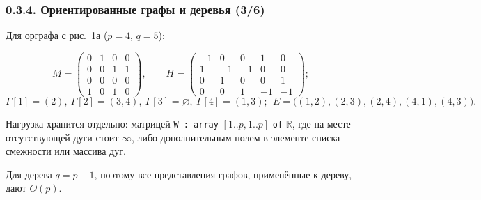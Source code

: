 \documentclass[mathserif,12pt,aspectratio=169]{beamer}
\begin{document}
\begin{frame}
\frametitle{0.3.4. Ориентированные графы и деревья (3/6)}

\begin{example}
Для орграфа с рис.~1а ($p=4$, $q=5$):
\end{example}
\vspace{-14pt}
$$M=\begin{pmatrix}0&1&0&0\\0&0&1&1\\0&0&0&0\\1&0&1&0\end{pmatrix}\!,\qquad
H=\begin{pmatrix}-1&0&0&1&0\\1&-1&-1&0&0\\0&1&0&0&1\\0&0&1&-1&-1\end{pmatrix}\!;$$
\vspace{-12pt}
$$\Gamma[1]=(2),\ \Gamma[2]=(3,4),\ \Gamma[3]=\varnothing,\ \Gamma[4]=(1,3);
\ \ E=\big((1,2),(2,3),(2,4),(4,1),(4,3)\big).$$
\vspace{-18pt}

Нагрузка хранится отдельно: матрицей \texttt{W : array} $[1..p,1..p]$
\texttt{of} $\mathbb{R}$, где на месте отсутствующей дуги стоит $\infty$, либо
дополнительным полем в элементе списка смежности или массива дуг.

\begin{remark}
Для дерева $q=p-1$, поэтому все представления графов, применённые к дереву, дают
$O(p)$.
\end{remark}
\end{frame}
\end{document}
